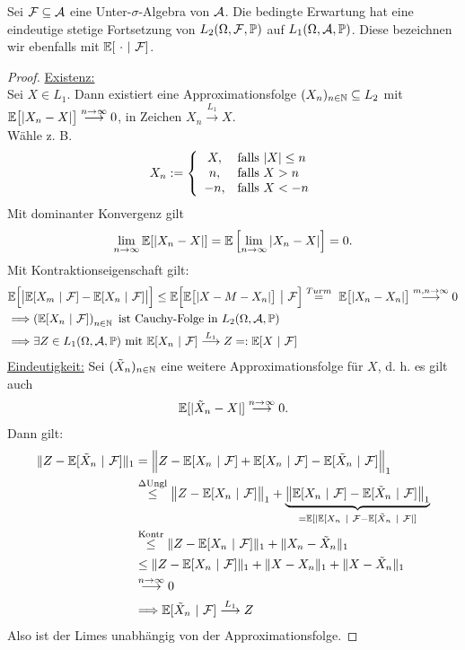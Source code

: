 \setcounter{satz}{5} %
\begin{proposition}\label{Prop1.6} %
Sei $\mathcal{F}\subseteq\mathcal{A}$ eine Unter-$\sigma$-Algebra von $\mathcal{A}$. Die bedingte Erwartung hat eine eindeutige stetige Fortsetzung von $L_2(\Omega,\mathcal{F},\mathbb{P})$ auf $L_1(\Omega,\mathcal{A},\mathbb{P})$. Diese bezeichnen wir ebenfalls mit $\mathbb{E}[~\cdot~|~\mathcal{F}]$.
\end{proposition}
\begin{proof}
\underline{Existenz:}\\
Sei $X\in L_1$. Dann existiert eine Approximationsfolge $(X_n)_{n\in\mathbb{N}}\subseteq L_2$ mit\\ $\mathbb{E}\big[|X_n-X|\big]\stackrel{n\to\infty}{\longrightarrow}0$, in Zeichen $X_n\stackrel{L_1}{\longrightarrow} X$.\\
Wähle z. B.
\begin{align*}
X_n:=\left\lbrace\begin{array}{cl}
X, & \text{falls } |X|\leq n\\
n, & \text{falls } X>n\\
-n, & \text{falls } X<-n
\end{array}\right.
\end{align*}
Mit dominanter Konvergenz gilt 
\begin{align*}
\lim\limits_{n\to\infty}\mathbb{E}[|X_n-X|]=\mathbb{E}\left[\lim\limits_{n\to\infty}|X_n-X|\right]=0.
\end{align*}
Mit Kontraktionseigenschaft gilt:
\begin{align*}
&\mathbb{E}\Big[\big|\mathbb{E}[X_m~|~\mathcal{F}]-\mathbb{E}[X_n~|~\mathcal{F}]\big|\Big]
	\leq\mathbb{E}\Big[\mathbb{E}\big[|X-M-X_n|\big]~\big|~\mathcal{F}\Big]
\stackrel{Turm}{=}~
\mathbb{E}\big[|X_n-X_n|\big]
\stackrel{m,n\to\infty}{\longrightarrow}
0\\
&\Longrightarrow\left(\mathbb{E}[X_n~|~\mathcal{F}]\right)_{n\in\mathbb{N}}\text{ ist Cauchy-Folge in }L_2(\Omega,\mathcal{A},\mathbb{P})\\
&\Longrightarrow\exists Z\in L_1(\Omega,\mathcal{A},\mathbb{P})\text{ mit }\mathbb{E}[X_n~|~\mathcal{F}]\stackrel{L_1}{\longrightarrow} Z=:\mathbb{E}[X~|~\mathcal{F}]
\end{align*}
\underline{Eindeutigkeit:} Sei $(\tilde{X}_n)_{n\in\mathbb{N}}$ eine weitere Approximationsfolge für $X$, d. h. es gilt auch
\begin{align*}
\mathbb{E}[|\tilde{X}_n-X|]
\stackrel{n\to\infty}{\longrightarrow}
0.
\end{align*}
Dann gilt:
\begin{align*}
\Vert Z-\mathbb{E}[\tilde{X}_n~|~\mathcal{F}]\Vert_1
&=\Big
\Vert Z-\mathbb{E}[X_n~|~\mathcal{F}]+\mathbb{E}[X_n~|~\mathcal{F}]-\mathbb{E}[\tilde{X}_n~|~\mathcal{F}]\Big\Vert_1\\
&\stackrel{\Delta\text{Ungl}}{\leq}
\big\Vert Z-\mathbb{E}[X_n~|~\mathcal{F}]\big\Vert_1+\underbrace{\big\Vert\mathbb{E}[X_n~|~\mathcal{F}]-\mathbb{E}[\tilde{X}_n~|~\mathcal{F}]\big\Vert_1}_{=\mathbb{E}[|\mathbb{E}[X_n~|~\mathcal{F}-\mathbb{E}[\tilde{X}_n~|~\mathcal{F}|]}\\
&\stackrel{\text{Kontr}}{\leq}
\Vert Z-\mathbb{E}[X_n~|~\mathcal{F}]\Vert_1+\Vert X_n-\tilde{X}_n\Vert_1\\
&\leq\Vert Z-\mathbb{E}[X_n~|~\mathcal{F}]\Vert_1+\Vert X-X_n\Vert_1+\Vert X-\tilde{X}_n\Vert_1\\
&\stackrel{n\to\infty}{\longrightarrow}
0\\
&\Longrightarrow\mathbb{E}[\tilde{X}_n~|~\mathcal{F}]\stackrel{L_1}{\longrightarrow} Z
\end{align*}
Also ist der Limes unabhängig von der Approximationsfolge.
\end{proof}

